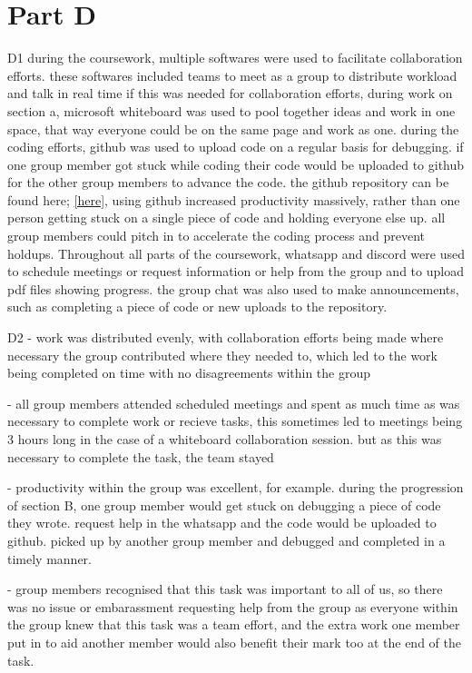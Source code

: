 \section{Part D}%
\label{closedloopy}

D1 during the coursework, multiple softwares were used to facilitate collaboration efforts. 
these softwares included teams to meet as a group to distribute workload and talk in real 
time if this was needed for collaboration efforts, during work on section a, microsoft 
whiteboard was used to pool together ideas and work in one space, that way everyone 
could be on the same page and work as one. during the coding efforts, github was used to
upload code on a regular basis for debugging. if one group member got stuck while coding
their code would be uploaded to github for the other group members to advance the code.
the github repository can be found here; \href{https://github.com/ELE2024-Controls/Coursework}{[here]}, using github increased productivity
massively, rather than one person getting stuck on a single piece of code and holding 
everyone else up. all group members could pitch in to accelerate the coding process
and prevent holdups. Throughout all parts of the coursework, whatsapp and discord were
used to schedule meetings or request information or help from the group and to upload pdf
files showing progress. the group chat was also used to make announcements, such as 
completing a piece of code or new uploads to the repository.

D2 - work was distributed evenly, with collaboration efforts being made where necessary
     the group contributed where they needed to, which led to the work being completed
     on time with no disagreements within the group
   
   - all group members attended scheduled meetings and spent as much time as was necessary 
     to complete work or recieve tasks, this sometimes led to meetings being 3 hours long
     in the case of a whiteboard collaboration session. but as this was necessary to 
     complete the task, the team stayed
   
   - productivity within the group was excellent, for example. during the progression of 
     section B, one group member would get stuck on debugging a piece of code they wrote.
     request help in the whatsapp and the code would be uploaded to github. picked up by 
     another group member and debugged and completed in a timely manner.

   - group members recognised that this task was important to all of us, so there was no
     issue or embarassment requesting help from the group as everyone within the group 
     knew that this task was a team effort, and the extra work one member put in to aid 
     another member would also benefit their mark too at the end of the task. 

